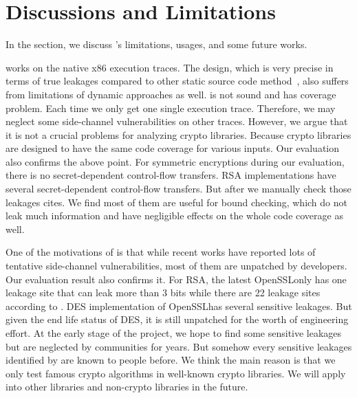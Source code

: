 \section{Discussions and Limitations}
In the section, we discuss \tool's limitations, usages, and
some future works.

\tool{} works on the native x86 execution traces. The design,
which is very precise in terms of true leakages compared to other
static source code method~\cite{197207,BacelarAlmeida:2013:FVS:2483313.2483334}, 
also suffers from limitations of dynamic approaches as well.
\tool{} is not sound and has coverage problem. Each time we only 
get one single execution trace. Therefore, we may neglect 
some side-channel vulnerabilities on other traces. However,
we argue that it is not a crucial problems for analyzing crypto
libraries. Because crypto libraries are designed to have the same
code coverage for various inputs. Our evaluation also confirms 
the above point. For symmetric encryptions during our evaluation, 
there is no secret-dependent control-flow transfers. RSA implementations
have several secret-dependent control-flow transfers. But after we 
manually check those leakages cites. We find most of them are useful
for bound checking, which do not leak much information and have 
negligible effects on the whole code coverage as well.

One of the motivations of \tool{} is that while recent works
have reported lots of tentative side-channel vulnerabilities,
most of them are unpatched by developers. Our evaluation result 
also confirms it. For RSA, the latest OpenSSL\@ only has one leakage
site that can leak more than 3 bits while there are 22 leakage sites
according to \tool{}. DES implementation of OpenSSL\@ has several 
sensitive leakages. But given the end life status of DES, it is 
still unpatched for the worth of engineering effort. At the early
stage of the project, we hope to find some sensitive leakages but are 
neglected by communities for years. But somehow every sensitive leakages
identified by \tool{} are known to people before. We think the main reason is
that we only test famous crypto algorithms in well-known crypto libraries. We will
apply \tool{} into other libraries and non-crypto libraries in the future. 



